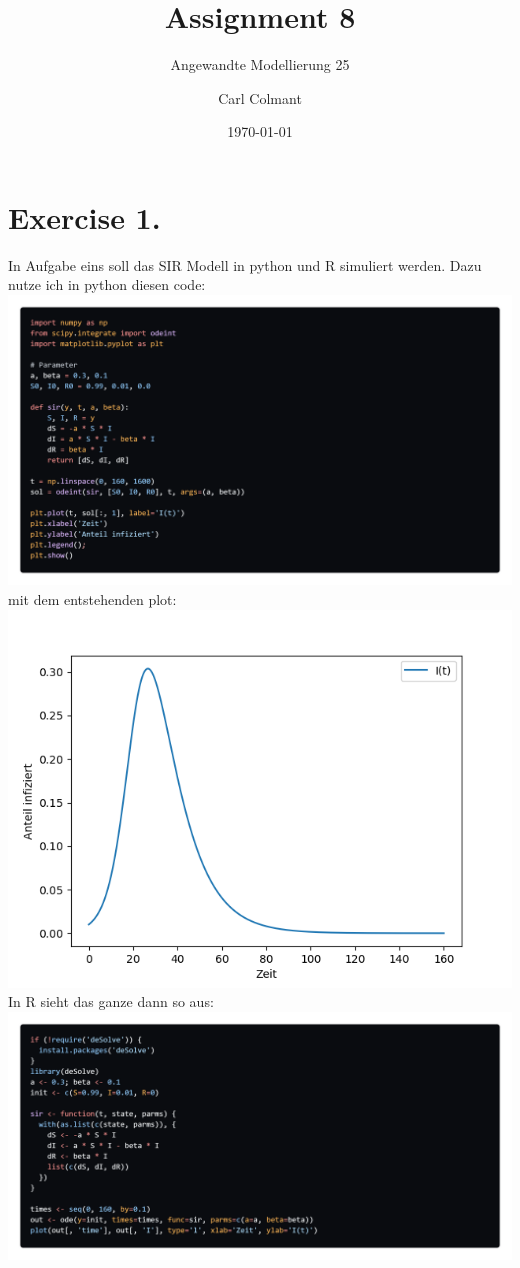 \documentclass{scrartcl}
\title{Assignment 8}
\subtitle{Angewandte Modellierung 25}
\author{Carl Colmant}
\date{\today}
\begin{document}
\maketitle
\newpage
\section*{Exercise 1. }
In Aufgabe eins soll das SIR Modell in python und R simuliert werden. Dazu nutze ich in python diesen code:\\
\includegraphics*[scale= 0.24]{SIR_py_code.png}
mit dem entstehenden plot:\\
\includegraphics*[scale=0.7]{Sir_modell_py.png}\\
In R sieht das ganze dann so aus:\\
\includegraphics*[scale = 0.25]{SIR_R_code.png}\\
\end{document}
